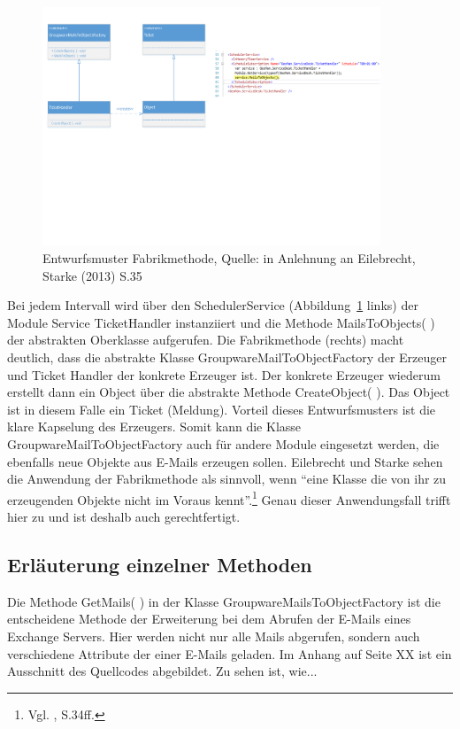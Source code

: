 \begin{figure}[h!]
\centering
\includegraphics[width=0.9\textwidth]{Abbildungen/Entwurfsmuster.pdf}
	\caption[Entwurfsmuster Fabrikmethode]{Entwurfsmuster Fabrikmethode, Quelle: in Anlehnung an Eilebrecht, Starke (2013) S.35}
	\label{fig:Entwurfsmuster}
\end{figure}

\noindent
Bei jedem Intervall wird über den SchedulerService (Abbildung~\ref{fig:Entwurfsmuster} links) der Module Service TicketHandler instanziiert und die Methode MailsToObjects( ) der abstrakten Oberklasse aufgerufen. Die Fabrikmethode (rechts) macht deutlich, dass die abstrakte Klasse GroupwareMailToObjectFactory der Erzeuger und Ticket Handler der konkrete Erzeuger ist. Der konkrete Erzeuger wiederum erstellt dann ein Object über die abstrakte Methode CreateObject( ). Das Object ist in diesem Falle ein Ticket (Meldung). Vorteil dieses Entwurfsmusters ist die klare Kapselung des Erzeugers. Somit kann die Klasse GroupwareMailToObjectFactory auch für andere Module eingesetzt werden, die ebenfalls neue Objekte aus E-Mails erzeugen sollen. Eilebrecht und Starke sehen die Anwendung der Fabrikmethode als sinnvoll, wenn \enquote{eine Klasse die von ihr zu erzeugenden Objekte nicht im Voraus kennt}.\footnote{Vgl. \citeauthor{PatternsKompakt} \citeyear{PatternsKompakt}, S.34ff.} Genau dieser Anwendungsfall trifft hier zu und ist deshalb auch gerechtfertigt.\\






\subsection{Erläuterung einzelner Methoden}
\noindent
Die Methode GetMails( ) in der Klasse GroupwareMailsToObjectFactory ist die entscheidene Methode der Erweiterung bei dem Abrufen der E-Mails eines Exchange Servers. Hier werden nicht nur alle Mails abgerufen, sondern auch verschiedene Attribute der einer E-Mails geladen. Im Anhang auf Seite XX ist ein Ausschnitt des Quellcodes abgebildet. Zu sehen ist, wie...\\

